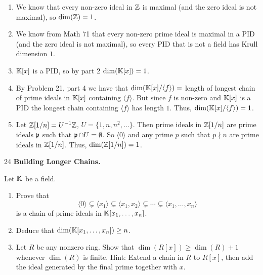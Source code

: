 \documentclass[Notebook.tex]{subfiles}
\begin{document}
\begin{solution}
    \bbni
    \begin{enumerate}
        \item We know that every non-zero ideal in $\mathbb Z$ is maximal (and the zero ideal is not maximal), so $\dim(\mathbb Z) = 1$. 
        
        \item We know from Math 71 that every non-zero prime ideal is maximal in a PID (and the zero ideal is not maximal), so every PID that is not a field has Krull dimension $1$. 
        
        \item $\mathbb K[x]$ is a PID, so by part 2 $\dim(\mathbb K[x]) = 1$. 
        
        \item By Problem 21, part 4 we have that $\dim(\mathbb K[x]/\langle f \rangle) = $ length of longest chain of prime ideals in $\mathbb K[x]$ containing $\langle f \rangle$. But since $f$ is non-zero and $\mathbb K[x]$ is a PID the longest chain containing $\langle f \rangle$ has length $1$. Thus, $\dim(\mathbb K[x]/\langle f \rangle) = 1$. 
        
        \item Let $\mathbb Z[1/n] = U^{-1}\mathbb Z$, $U = \{1, n, n^2, \ldots\}$. Then prime ideals in $\mathbb Z[1/n]$ are prime ideals $\operatorname{\mathfrak{p}}$ such that $\operatorname{\mathfrak{p}} \cap U = \emptyset$. So $\langle 0 \rangle$ and any prime $p$ such that $p \nmid n$ are prime ideals in $\mathbb Z[1/n]$. Thus, $\dim(\mathbb Z[1/n]) = 1$. 
    \end{enumerate}
\end{solution}

\newpage

\begin{problem}{24} \textbf{Building Longer Chains.} 
    
    Let $\mathbb K$ be a field.
    \begin{enumerate}
        \item Prove that
        \[
        \langle 0\rangle
        \subsetneq
        \langle x_1\rangle
        \subsetneq
        \langle x_1,x_2\rangle
        \subsetneq
        \cdots
        \subsetneq
        \langle x_1,\ldots,x_n\rangle
        \]
        is a chain of prime ideals in $\mathbb K[x_1,\ldots,x_n]$.
        \item Deduce that $\dim(\mathbb K[x_1,\ldots,x_n])\geq n$.
        \item Let $R$ be any nonzero ring. Show that $\dim(R[x])\geq \dim(R)+1$ whenever $\dim(R)$ is finite. Hint: Extend a chain in $R$ to $R[x]$, then add the ideal generated by the final prime together with $x$.
    \end{enumerate}    
\end{problem}
\end{document}
